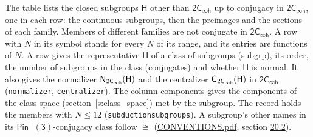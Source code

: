\documentclass[10pt,a4paper]{article}
\numberwithin{equation}{section}
\newcommand{\grp}[1]{\mathsf{#1}}
\newcommand{\samecls}{\cong}
\newcommand{\hairsp}{\mkern1mu}
\begin{document}
\leavevmode\label{n:group.H}The table lists the closed subgroups $\grp{H}$ other than $\grp{2C_{\infty h}}$ up to conjugacy in $\grp{2C_{\infty h}}$, one in each row: the continuous subgroups, then the preimages and the sections of each family. Members of different families are not conjugate in $\grp{2C_{\infty h}}$. A row with $N$ in its symbol stands for every $N$ of its range, and its entries are functions of $N$. \label{n:head.subgroup}\label{n:head.order}\label{n:head.conjugates}\label{n:head.normal}A row gives the representative $\grp{H}$ of a class of subgroups (subgrp), its order, the number of subgroups in the class (conjugates) and whether $\grp{H}$ is normal. \label{n:group.normalizer}\label{n:group.centralizer}It also gives the normalizer $\grp{N}_{\hairsp \grp{2C_{\infty h}}}(\grp{H})$ and the centralizer $\grp{C}_{\hairsp \grp{2C_{\infty h}}}(\grp{H})$ in $\grp{2C_{\infty h}}$ (\texttt{normalizer}, \texttt{centralizer}). \label{n:head.components}The column components gives the components of the class space (section~\ref{s:class_space}) met by the subgroup. The record holds the members with $N \le 12$ (\texttt{subductionsubgroups}). A subgroup's other names in its \href{Pinminus3.pdf}{$\grp{Pin^{-}(3)}$}-conjugacy class follow $\samecls$ (\href{../../CONVENTIONS.pdf}{CONVENTIONS.pdf}, section \href{../../CONVENTIONS.pdf\#conv.20.2}{20.2}).
\end{document}
